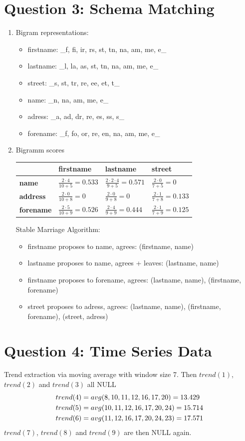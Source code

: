 \documentclass{article}
\begin{document}
	\section*{Question 3: Schema Matching}
	\begin{enumerate}[label=(\alph*)]
		\item Bigram representations:
		\begin{itemize}
			\item firstname: \_f, fi, ir, rs, st, tn, na, am, me, e\_
			\item lastname: \_l, la, as, st, tn, na, am, me, e\_
			\item street: \_s, st, tr, re, ee, et, t\_
			\item name: \_n, na, am, me, e\_
			\item adress: \_a, ad, dr, re, es, ss, s\_
			\item forename: \_f, fo, or, re, en, na, am, me, e\_
		\end{itemize}
		\item Bigramm scores
		\begin{center}
			\begin{tabular}{l|l|l|l}
				& \textbf{firstname} & \textbf{lastname} & \textbf{street} \\
				\hline
				\textbf{name} & $\frac{2\cdot 4}{10+5}=0.533$ & $\frac{2\cdot 2\cdot 4}{9+5}=0.571$ & $\frac{2\cdot 0}{7+5}=0$ \\
				\hline
				\textbf{address} & $\frac{2\cdot 0}{10+8}=0$ & $\frac{2\cdot 0}{9+8}=0$ & $\frac{2\cdot 1}{7+8}=0.133$ \\
				\hline
				\textbf{forename} & $\frac{2\cdot 5}{10+9}=0.526$ & $\frac{2\cdot 4}{9+9}=0.444$ & $\frac{2\cdot 1}{7+9}=0.125$
			\end{tabular}
		\end{center}
		Stable Marriage Algorithm:
		\begin{itemize}
			\item firstname proposes to name, agrees: (firstname, name)
			\item lastname proposes to name, agrees + leaves: (lastname, name)
			\item firstname proposes to forename, agrees: (lastname, name), (firstname, forename)
			\item street proposes to adress, agrees: (lastname, name), (firstname, forename), (street, adress)
		\end{itemize}
	\end{enumerate}

	\section*{Question 4: Time Series Data}
	Trend extraction via moving average with window size 7. Then $trend(1)$, $trend(2)$ and $trend(3)$ all NULL
	\begin{align}
		trend(4) &= avg(8,10,11,12,16,17,20) = 13.429 \notag \\
		trend(5) &= avg(10,11,12,16,17,20, 24) = 15.714 \notag \\
		trend(6) &= avg(11,12,16,17,20, 24, 23) = 17.571 \notag
	\end{align}
	$trend(7)$, $trend(8)$ and $trend(9)$ are then NULL again.
	
\end{document}
